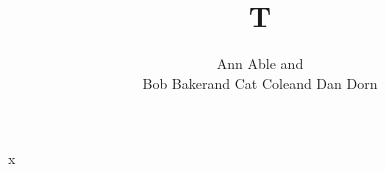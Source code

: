 \documentclass[graybox]{svmult}
\begin{document}
\title*{T}
\author{Ann Able and\\ Bob Baker\break and Cat Cole\linebreak and Dan Dorn}
\maketitle
x
\end{document}
